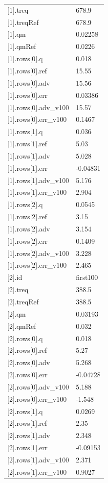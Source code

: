 {\begin{longtable}{p{}p{}}
{}[1].treq & 678.9\\
{}[1].treqRef & 678.9\\
{}[1].qm & 0.02258\\
{}[1].qmRef & 0.0226\\
{}[1].rows[0].q & 0.018\\
{}[1].rows[0].ref & 15.55\\
{}[1].rows[0].adv & 15.56\\
{}[1].rows[0].err & 0.03386\\
{}[1].rows[0].adv\_v100 & 15.57\\
{}[1].rows[0].err\_v100 & 0.1467\\
{}[1].rows[1].q & 0.036\\
{}[1].rows[1].ref & 5.03\\
{}[1].rows[1].adv & 5.028\\
{}[1].rows[1].err & -0.04831\\
{}[1].rows[1].adv\_v100 & 5.176\\
{}[1].rows[1].err\_v100 & 2.904\\
{}[1].rows[2].q & 0.0545\\
{}[1].rows[2].ref & 3.15\\
{}[1].rows[2].adv & 3.154\\
{}[1].rows[2].err & 0.1409\\
{}[1].rows[2].adv\_v100 & 3.228\\
{}[1].rows[2].err\_v100 & 2.465\\
{}[2].id & first100\\
{}[2].treq & 388.5\\
{}[2].treqRef & 388.5\\
{}[2].qm & 0.03193\\
{}[2].qmRef & 0.032\\
{}[2].rows[0].q & 0.018\\
{}[2].rows[0].ref & 5.27\\
{}[2].rows[0].adv & 5.268\\
{}[2].rows[0].err & -0.04728\\
{}[2].rows[0].adv\_v100 & 5.188\\
{}[2].rows[0].err\_v100 & -1.548\\
{}[2].rows[1].q & 0.0269\\
{}[2].rows[1].ref & 2.35\\
{}[2].rows[1].adv & 2.348\\
{}[2].rows[1].err & -0.09153\\
{}[2].rows[1].adv\_v100 & 2.371\\
{}[2].rows[1].err\_v100 & 0.9027\\

\end{longtable}}
